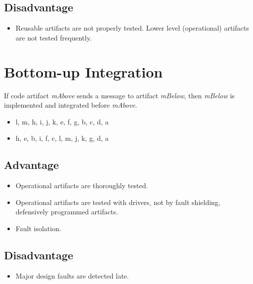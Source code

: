 \documentclass[11pt]{article}
\begin{document}
\subsection*{Disadvantage}

\begin{itemize}
	\item 
	
	Reusable artifacts are not properly tested. Lower level (operational) artifacts are not tested frequently.
	
\end{itemize}

\section*{Bottom-up Integration}

If code artifact \textit{mAbove} sends a message to artifact \textit{mBelow}, then \textit{mBelow} is implemented and integrated before \textit{mAbove}.

\begin{itemize}
	\item l, m, h, i, j, k, e, f, g, b, c, d, a
	\item h, e, b, i, f, c, l, m, j, k, g, d, a
\end{itemize}


\subsection*{Advantage}

\begin{itemize}
	\item
	
	Operational artifacts are thoroughly tested.

	\item 
	
	Operational artifacts are tested with drivers, not by fault shielding, defensively programmed artifacts.

	\item
	
	Fault isolation.
	
\end{itemize}

\subsection*{Disadvantage}

\begin{itemize}
	\item 
	
	Major design faults are detected late.
	
\end{itemize}
\end{document}
